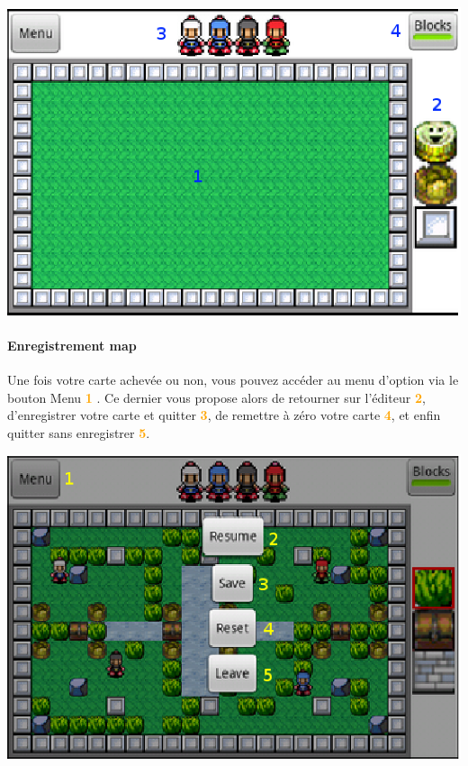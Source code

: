 	
	\begin{center}
		\includegraphics[scale=0.9]{Manuel/Img/11.eps}
	\end{center}
	
	\paragraph{Enregistrement map\\}
	Une fois votre carte achevée ou non, vous pouvez accéder au menu d'option
	via le bouton Menu \textcolor{orange}{\textbf{1}} . Ce dernier vous propose
	alors de retourner sur l'éditeur \textcolor{orange}{\textbf{2}}, d'enregistrer votre
	carte et quitter \textcolor{orange}{\textbf{3}}, de remettre à zéro votre carte
	\textcolor{orange}{\textbf{4}}, et enfin quitter sans enregistrer
	\textcolor{orange}{\textbf{5}}. 
	
	\begin{center}
		\includegraphics[scale=0.9]{Manuel/Img/13.eps}
	\end{center}
	
